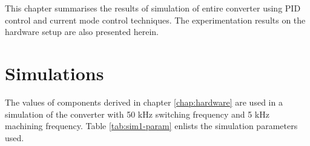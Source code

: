 \label{chap:results}
    This chapter summarises the results of simulation of entire converter using PID control and current mode control techniques. The experimentation results on the hardware setup are also presented herein.

\section{Simulations}
	The values of components derived in chapter \ref{chap:hardware} are used in a simulation of the converter with 50 kHz switching frequency and 5 kHz machining frequency. Table \ref{tab:sim1-param} enlists the simulation parameters used.
	\begin{comment}
		The voltage and current waveforms across the load when direct duty ratio control is used are shown in figure \ref{fig:1b}. Figure \ref{fig:sim-cmc} shows the load voltage and current waveforms when current mode control is used. The output waveforms thus obtained are in well agreement with the results in \cite{tastekin2009novel}.
		\begin{figure}[H]
			\begin{subfigure}{0.49\textwidth}
				\centering
				\texttt{[image: load\_comp]}
				\caption{Direct duty ratio control}
				\label{fig:1b}
			\end{subfigure}
			\begin{subfigure}{0.49\textwidth}
				\centering
				\texttt{[image: load\_cmc]}
				\caption{Current mode control}
				\label{fig:sim-cmc}
			\end{subfigure}
			\caption{Load voltage and current}
		\end{figure}
		Figure \ref{fig:sim-qd} shows the voltage across $Q_d$ and current through $Q_d$ waveforms when direct duty ratio control is used. The maximum voltage across $Q_d$ is $V_{\text{ref}}$ i.e. 80 V and and the maximum current through $Q_d$ is 11 A during the rise time. Figure \ref{fig:sim-d} shows the voltage across $D$ and current through $D$ waveforms when direct duty ratio control is used. The maximum reverse voltage across $D$ is 83 V and the maximum forward current through it is 0.8 A.
		\begin{figure}[H]
			\begin{subfigure}{0.49\textwidth}
				\centering
				\texttt{[image: Qd]}
				\caption{Voltage and current of Qd}
				\label{fig:sim-qd}
			\end{subfigure}

\end{comment}
